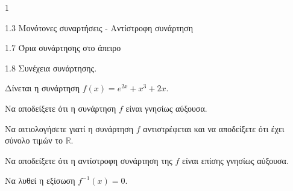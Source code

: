 \begin{ylh}{1}
    \item 1.3 Μονότονες συναρτήσεις - Αντίστροφη συνάρτηση
    \item 1.7 Όρια συνάρτησης στο άπειρο
    \item 1.8 Συνέχεια συνάρτησης.
\end{ylh}
Δίνεται η συνάρτηση $f(x) = e^{2x} + x^3 + 2x$.
\begin{alist}
\item Να αποδείξετε ότι η συνάρτηση $f$ είναι γνησίως αύξουσα. 
\item Να αιτιολογήσετε γιατί η συνάρτηση $f$ αντιστρέφεται και να αποδείξετε ότι έχει σύνολο τιμών το $\mathbb{R}$. 
\item Να αποδείξετε ότι η αντίστροφη συνάρτηση της $f$ είναι επίσης γνησίως αύξουσα. 
\item Να λυθεί η εξίσωση $f^{-1}(x) = 0$. 
\end{alist}